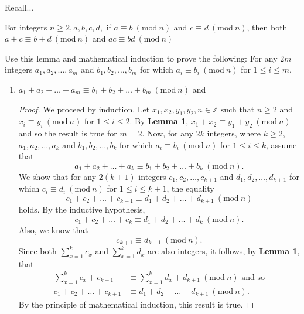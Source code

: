 \documentclass[12pt]{article}
\newcommand{\Z}{\mathbb{Z}}
\newcommand{\Mod}[1]{\ (\mathrm{mod}\ #1)}
\newenvironment{lemma}[2][Lemma]{\begin{trivlist}
		\item[\hskip \labelsep {\bfseries #1}\hskip \labelsep {\bfseries #2.}]}{\end{trivlist}}
\newenvironment{problem}[2][Problem]{\begin{trivlist}
		\item[\hskip \labelsep {\bfseries #1}\hskip \labelsep {\bfseries #2.}]}{\end{trivlist}}
\begin{document}
\begin{problem}{30}
	Recall... 
	\begin{lemma}{1}
		For integers $n\geq 2,a,b,c,d,$ if $a\equiv b \Mod{n}$ and $c\equiv d \Mod{n}$, then both $a+c \equiv b+d \Mod{n}$ and $ac \equiv bd \Mod{n}$
	\end{lemma}
	Use this lemma and mathematical induction to prove the following: For any $2m$ integers $a_{1},a_{2},\ldots,a_{m}$ and $b_{1},b_{2},\ldots,b_{m}$ for which $a_{i}\equiv b_{i} \Mod{n}$ for $1\leq i \leq m$,
	\begin{enumerate}
		\item $a_{1}+a_{2}+\ldots+a_{m} \equiv b_{1}+b_{2}+\ldots+b_{m} \Mod{n}$ and
		\begin{proof}
			We proceed by induction. Let $x_{1},x_{2},y_{1},y_{2},n \in \Z$ such that $n\geq 2$ and $x_{i} \equiv y_{i} \Mod{n}$ for $1\leq i \leq 2$. By \textbf{Lemma 1}, $x_{1}+x_{2}\equiv y_{1}+y_{2} \Mod{n}$ and so the result  is true for $m=2$. Now, for any $2k$ integers, where $k\geq 2$, $a_{1},a_{2},\ldots,a_{k}$ and $b_{1},b_{2},\ldots,b_{k}$ for which $a_{i}\equiv b_{i} \Mod{n}$ for $1\leq i \leq k$, assume that 
			\begin{equation*}
				a_{1}+a_{2}+\ldots+a_{k} \equiv b_{1}+b_{2}+\ldots+b_{k} \Mod{n}.
			\end{equation*}
		We show that for any $2(k+1)$ integers $c_{1},c_{2},\ldots, c_{k+1}$ and $d_{1},d_{2}, \ldots, d_{k+1}$ for which $c_{i} \equiv d_{i} \Mod{n}$ for $1\leq i \leq k+1$, the equality
		\begin{equation*}
			c_{1}+c_{2}+\ldots+c_{k+1} \equiv d_{1}+d_{2}+\ldots+d_{k+1} \Mod{n} 
		\end{equation*}
		holds. By the inductive hypothesis, 
		\begin{equation*}
					c_{1}+c_{2}+\ldots+c_{k} \equiv d_{1}+d_{2}+\ldots+d_{k} \Mod{n}.
		\end{equation*}
		Also, we know that 
		\begin{equation*}
		c_{k+1} \equiv d_{k+1} \Mod{n}.
		\end{equation*} 
		Since both $\sum_{x=1}^{k}c_{x}$ and $\sum_{x=1}^{k}d_{x}$ are also integers, it follows, by \textbf{Lemma 1}, that
		\begin{align*}
			\sum_{x=1}^{k}c_{x} + c_{k+1} &\equiv \sum_{x=1}^{k}d_{x} + d_{k+1} \Mod{n} \text{   and so}\\
			c_{1}+c_{2}+\ldots+c_{k+1} &\equiv d_{1}+d_{2}+\ldots+d_{k+1} \Mod{n}.
		\end{align*}
	By the principle of mathematical induction, this result is true.

\end{proof}
\end{enumerate}
\end{problem}
\end{document}

